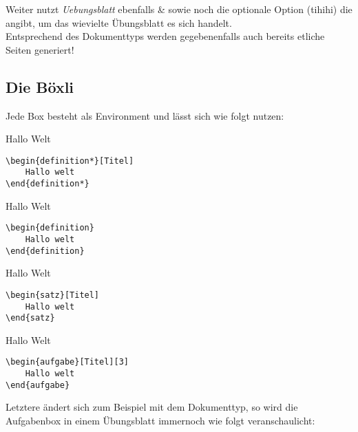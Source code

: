 Weiter nutzt \emph{Uebungsblatt} ebenfalls \& sowie noch die optionale Option (tihihi)  die angibt, um das wievielte Übungsblatt es sich handelt. \\

Entsprechend des Dokumenttyps werden gegebenenfalls auch bereits etliche Seiten generiert!

\subsection[Wie funktionieren Boxen]{Die Böxli}
Jede Box besteht als Environment und lässt sich wie folgt nutzen:
\begin{multicols}{2}
\begin{definition*}[Titel]
    Hallo Welt
\begin{lstlisting}[language=lLatex]
\begin{definition*}[Titel]
    Hallo welt
\end{definition*}\end{lstlisting}
\end{definition*}

\begin{definition}
    Hallo Welt
\begin{lstlisting}[language=lLatex]
\begin{definition}
    Hallo welt
\end{definition}\end{lstlisting}
\end{definition}

\begin{satz}[Titel]
    Hallo Welt
\begin{lstlisting}[language=lLatex]
\begin{satz}[Titel]
    Hallo welt
\end{satz}\end{lstlisting}
\end{satz}

\begin{aufgabe}[Titel][3]
    Hallo Welt
\begin{lstlisting}[language=lLatex]
\begin{aufgabe}[Titel][3]
    Hallo welt
\end{aufgabe}\end{lstlisting}
\end{aufgabe}
\end{multicols}
Letztere ändert sich zum Beispiel mit dem Dokumenttyp, so wird die Aufgabenbox in einem Übungsblatt immernoch wie folgt veranschaulicht:
